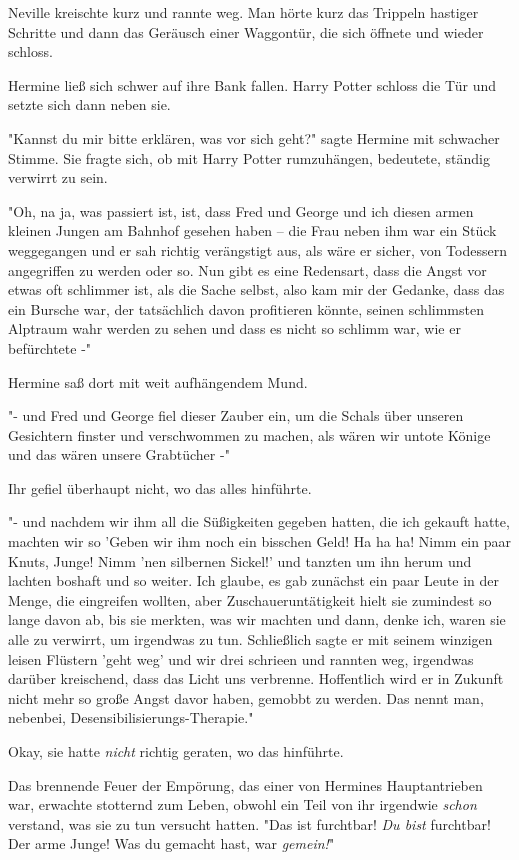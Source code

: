 {Neville kreischte kurz und rannte weg. Man hörte kurz das Trippeln hastiger Schritte und dann das Geräusch einer Waggontür, die sich öffnete und wieder schloss.

Hermine ließ sich schwer auf ihre Bank fallen. Harry Potter schloss die Tür und setzte sich dann neben sie.

"Kannst du mir bitte erklären, was vor sich geht?" sagte Hermine mit schwacher Stimme. Sie fragte sich, ob mit Harry Potter rumzuhängen, bedeutete, ständig verwirrt zu sein.

"Oh, na ja, was passiert ist, ist, dass Fred und George und ich diesen armen kleinen Jungen am Bahnhof gesehen haben -- die Frau neben ihm war ein Stück weggegangen und er sah richtig verängstigt aus, als wäre er sicher, von Todessern angegriffen zu werden oder so. Nun gibt es eine Redensart, dass die Angst vor etwas oft schlimmer ist, als die Sache selbst, also kam mir der Gedanke, dass das ein Bursche war, der tatsächlich davon profitieren könnte, seinen schlimmsten Alptraum wahr werden zu sehen und dass es nicht so schlimm war, wie er befürchtete -"

Hermine saß dort mit weit aufhängendem Mund.

"- und Fred und George fiel dieser Zauber ein, um die Schals über unseren Gesichtern finster und verschwommen zu machen, als wären wir untote Könige und das wären unsere Grabtücher -"

Ihr gefiel überhaupt nicht, wo das alles hinführte.

"- und nachdem wir ihm all die Süßigkeiten gegeben hatten, die ich gekauft hatte, machten wir so 'Geben wir ihm noch ein bisschen Geld! Ha ha ha! Nimm ein paar Knuts, Junge! Nimm 'nen silbernen Sickel!' und tanzten um ihn herum und lachten boshaft und so weiter. Ich glaube, es gab zunächst ein paar Leute in der Menge, die eingreifen wollten, aber Zuschaueruntätigkeit hielt sie zumindest so lange davon ab, bis sie merkten, was wir machten und dann, denke ich, waren sie alle zu verwirrt, um irgendwas zu tun. Schließlich sagte er mit seinem winzigen leisen Flüstern 'geht weg' und wir drei schrieen und rannten weg, irgendwas darüber kreischend, dass das Licht uns verbrenne. Hoffentlich wird er in Zukunft nicht mehr so große Angst davor haben, gemobbt zu werden. Das nennt man, nebenbei, Desensibilisierungs-Therapie."

Okay, sie hatte \emph{nicht} richtig geraten, wo das hinführte.

Das brennende Feuer der Empörung, das einer von Hermines Hauptantrieben war, erwachte stotternd zum Leben, obwohl ein Teil von ihr irgendwie \emph{schon} verstand, was sie zu tun versucht hatten. "Das ist furchtbar! \emph{Du bist} furchtbar! Der arme Junge! Was du gemacht hast, war \emph{gemein!}"

}

